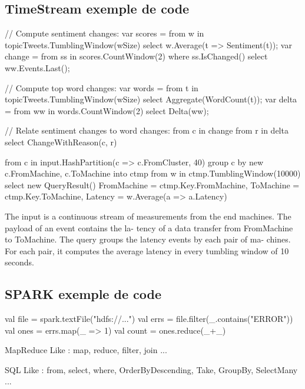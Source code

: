   \subsection{TimeStream exemple de code}
  \begin{code}[Java]
    // Compute sentiment changes:
    var scores = from w in topicTweets.TumblingWindow(wSize)
                 select w.Average(t => Sentiment(t));
    var change = from ss in scores.CountWindow(2)
                 where ss.IsChanged()
                 select ww.Events.Last();

    // Compute top word changes:
    var words = from t in topicTweets.TumblingWindow(wSize)
                 select Aggregate(WordCount(t));
    var delta = from ww in words.CountWindow(2)
                select Delta(ww);

    // Relate sentiment changes to word changes:
    from c in change
    from r in delta
    select ChangeWithReason(c, r)
  \end{code}
  \vspace{2mm}
  \begin{code}[Java]
    from c in input.HashPartition(c => c.FromCluster, 40)
    group c by new { c.FromMachine, c.ToMachine } into ctmp
    from w in ctmp.TumblingWindow(10000)
    select new QueryResult() {
      FromMachine = ctmp.Key.FromMachine,
      ToMachine = ctmp.Key.ToMachine,
      Latency = w.Average(a => a.Latency)
    }
  \end{code}
  The input is a continuous stream of measurements from the end machines. The payload of an event contains the la- tency of a data transfer from FromMachine to ToMachine. The query groups the latency events by each pair of ma- chines. For each pair, it computes the average latency in every tumbling window of 10 seconds.

  \subsection{SPARK exemple de code}
  \begin{code}[Java]
    val file = spark.textFile("hdfs://...")
    val errs = file.filter(_.contains("ERROR"))
    val ones = errs.map(_ => 1)
    val count = ones.reduce(_+_)
  \end{code}


  MapReduce Like : map, reduce, filter, join ...

  SQL Like : from, select, where, OrderByDescending, Take, GroupBy, SelectMany ...



